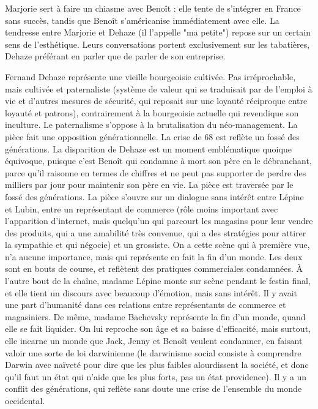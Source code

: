 \documentclass[a4paper,12pt]{book}
\begin{document}
\par Marjorie sert à faire un chiasme avec Benoît : elle tente de s'intégrer en France sans succès, tandis que Benoît s'américanise immédiatement avec elle. La tendresse entre Marjorie et Dehaze (il l'appelle "ma petite") repose sur un certain sens de l'esthétique. Leurs conversations portent exclusivement sur les tabatières, Dehaze préférant en parler que de parler de son entreprise.
\par Fernand Dehaze représente une vieille bourgeoisie cultivée. Pas irréprochable, mais cultivée et paternaliste (système de valeur qui se traduisait par de l'emploi à vie et d'autres mesures de sécurité, qui reposait sur une loyauté réciproque entre loyauté et patrons), contrairement à la bourgeoisie actuelle qui revendique son inculture. Le paternalisme s'oppose à la brutalisation du néo-management. La pièce fait une opposition générationnelle. La crise de 68 est reflète un fossé des générations. La disparition de Dehaze est un moment emblématique quoique équivoque, puisque c'est Benoît qui condamne à mort son père en le débranchant, parce qu'il raisonne en termes de chiffres et ne peut pas supporter de perdre des milliers par jour pour maintenir son père en vie. La pièce est traversée par le fossé des générations. La pièce s'ouvre sur un dialogue sans intérêt entre Lépine et Lubin, entre un représentant de commerce (rôle moins important avec l'apparition d'internet, mais quelqu'un qui parcourt les magasins pour leur vendre des produits, qui a une amabilité très convenue, qui a des stratégies pour attirer la sympathie et qui négocie) et un grossiste. On a cette scène qui à première vue, n'a aucune importance, mais qui représente en fait la fin d'un monde. Les deux sont en bouts de course, et reflètent des pratiques commerciales condamnées. À l'autre bout de la chaîne, madame Lépine monte sur scène pendant le festin final, et elle tient un discours avec beaucoup d'émotion, mais sans intérêt. Il y avait une part d'humanité dans ces relations entre représentants de commerce et magasiniers. De même, madame Bachevsky représente la fin d'un monde, quand elle se fait liquider. On lui reproche son âge et sa baisse d'efficacité, mais surtout, elle incarne un monde que Jack, Jenny et Benoît veulent condamner, en faisant valoir une sorte de loi darwinienne (le darwinisme social consiste à comprendre Darwin avec naïveté pour dire que les plus faibles alourdissent la société, et donc qu'il faut un état qui n'aide que les plus forts, pas un état providence). Il y a un conflit des générations, qui reflète sans doute une crise de l'ensemble du monde occidental.
\end{document}
